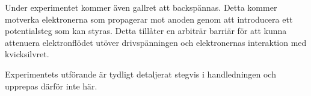 Under experimentet kommer även gallret att backspännas. Detta kommer motverka elektronerna som propagerar mot anoden genom att introducera ett potentialsteg som kan styras. Detta tillåter en arbiträr barriär för att kunna attenuera elektronflödet utöver drivspänningen och elektronernas interaktion med kvicksilvret. 

Experimentets utförande är tydligt detaljerat stegvis i handledningen\cite{handledning} och upprepas därför inte här. 

